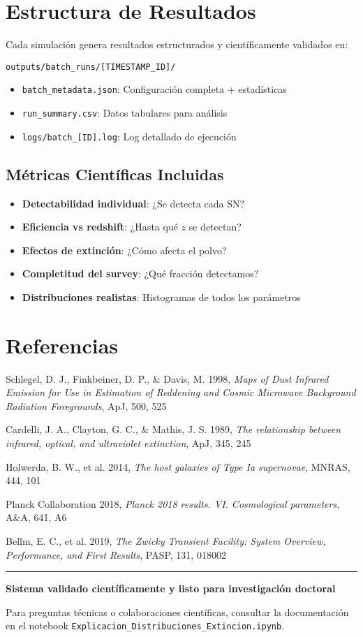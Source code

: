 \documentclass[11pt,a4paper]{article}
\begin{document}
\section{Estructura de Resultados}

Cada simulación genera resultados estructurados y científicamente validados en:

\texttt{outputs/batch\_runs/[TIMESTAMP\_ID]/}

\begin{itemize}
    \item \texttt{batch\_metadata.json}: Configuración completa + estadísticas
    \item \texttt{run\_summary.csv}: Datos tabulares para análisis
    \item \texttt{logs/batch\_[ID].log}: Log detallado de ejecución
\end{itemize}

\subsection{Métricas Científicas Incluidas}

\begin{itemize}
    \item \textbf{Detectabilidad individual}: ¿Se detecta cada SN?
    \item \textbf{Eficiencia vs redshift}: ¿Hasta qué $z$ se detectan?
    \item \textbf{Efectos de extinción}: ¿Cómo afecta el polvo?
    \item \textbf{Completitud del survey}: ¿Qué fracción detectamos?
    \item \textbf{Distribuciones realistas}: Histogramas de todos los parámetros
\end{itemize}

\section{Referencias}

\begin{thebibliography}{9}

Schlegel, D. J., Finkbeiner, D. P., \& Davis, M. 1998, 
\textit{Maps of Dust Infrared Emission for Use in Estimation of Reddening and Cosmic Microwave Background Radiation Foregrounds}, 
ApJ, 500, 525

Cardelli, J. A., Clayton, G. C., \& Mathis, J. S. 1989,
\textit{The relationship between infrared, optical, and ultraviolet extinction},
ApJ, 345, 245

Holwerda, B. W., et al. 2014,
\textit{The host galaxies of Type Ia supernovae},
MNRAS, 444, 101

Planck Collaboration 2018,
\textit{Planck 2018 results. VI. Cosmological parameters},
A\&A, 641, A6

Bellm, E. C., et al. 2019,
\textit{The Zwicky Transient Facility: System Overview, Performance, and First Results},
PASP, 131, 018002

\end{thebibliography}

\vspace{1cm}
\hrule
\vspace{0.5cm}
\textbf{Sistema validado científicamente y listo para investigación doctoral}

Para preguntas técnicas o colaboraciones científicas, consultar la documentación en el notebook \texttt{Explicacion\_Distribuciones\_Extincion.ipynb}.
\end{document}
